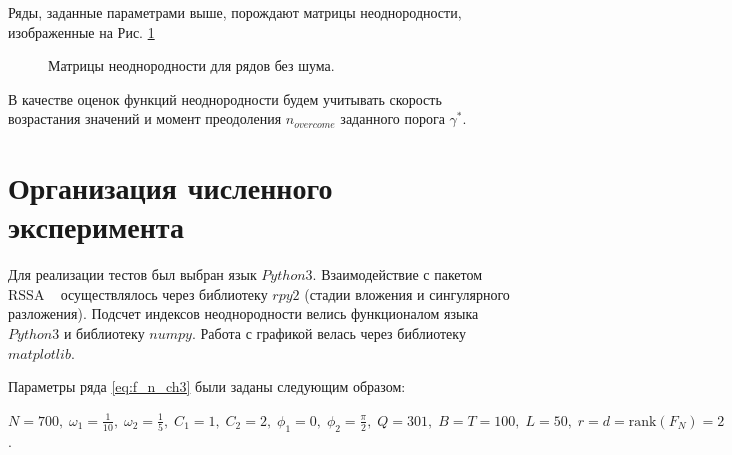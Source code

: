 \documentclass[specialist, substylefile = spbu.rtx,
			   subf, href, 12pt]{disser}
\begin{document}
Ряды, заданные параметрами выше, порождают матрицы неоднородности, изображенные на Рис. \ref{pic:heterogeneity_types}
\begin{figure}[!hhh]
	\caption{Матрицы неоднородности для рядов без шума.}
	\label{pic:heterogeneity_types}
\end{figure}


В качестве оценок функций неоднородности будем учитывать скорость возрастания значений и момент преодоления $n_{overcome}$ заданного порога $\gamma^*$.


\section{Организация численного эксперимента}
Для реализации тестов был выбран язык $Python3$. Взаимодействие с пакетом $\mathrm{RSSA}$ ~\cite{rssa_package, RSSA_BASIC, RSSA, RSSA_MULTIVATIATE} осуществлялось через библиотеку $rpy2$ (стадии вложения и сингулярного разложения). Подсчет индексов неоднородности велись функционалом языка $Python3$ и библиотеку $numpy$. Работа с графикой велась через библиотеку $matplotlib$. 

Параметры ряда \eqref{eq:f_n_ch3} были заданы следующим образом: 

$ N = 700, \;\omega_1 = \frac{1}{10},\; \omega_2 = \frac{1}{5},\; C_1 = 1, \; C_2 = 2,\; \phi_1=0,\; \phi_2=\frac{\pi}{2},\; Q = 301,\; B = T = 100,\; L = 50,\; r=d=\mathrm{rank}(F_N)=2$.
\end{document}
